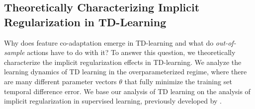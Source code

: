 \vspace{-0.2cm}
\subsection{Theoretically Characterizing Implicit Regularization in TD-Learning}
\label{sec:theory} 
\vspace{-0.2cm}
Why does feature co-adaptation emerge in TD-learning and what do \emph{out-of-sample} actions have to do with it? To answer this question, we theoretically characterize the implicit regularization effects in TD-learning. We analyze the learning dynamics of TD learning in the overparameterized regime, where there are many different parameter vectors $\theta$ that fully minimize the training set temporal difference error. We base our analysis of TD learning on the analysis of implicit regularization in supervised learning, previously developed by \citet{blanc2020implicit,damian2021label}.

